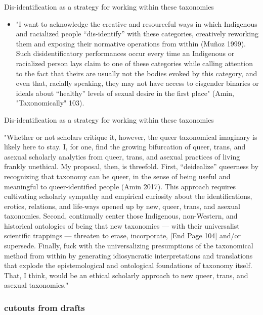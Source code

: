 \documentclass[11pt]{article}
\begin{document}
\begin{enumerate}
Dis-identification as a strategy for working within these taxonomies
\begin{itemize}
\item "I want to acknowledge the creative and resourceful ways in which
Indigenous and racialized people “dis-identify” with these
categories, creatively reworking them and exposing their normative
operations from within (Muñoz 1999). Such disidentificatory
performances occur every time an Indigenous or racialized person
lays claim to one of these categories while calling attention to the
fact that theirs are usually not the bodies evoked by this category,
and even that, racially speaking, they may not have access to
cisgender binaries or ideals about “healthy” levels of sexual desire
in the first place" (Amin, "Taxonomically" 103).
\end{itemize}


Dis-identification as a strategy for working within these taxonomies

"Whether or not scholars critique it, however, the queer taxonomical
imaginary is likely here to stay. I, for one, find the growing
bifurcation of queer, trans, and asexual scholarly analytics from
queer, trans, and asexual practices of living frankly unethical. My
proposal, then, is threefold. First, “deidealize” queerness by
recognizing that taxonomy can be queer, in the sense of being useful
and meaningful to queer-identified people (Amin 2017). This approach
requires cultivating scholarly sympathy and empirical curiosity about
the identifications, erotics, relations, and life-ways opened up by
new, queer, trans, and asexual taxonomies. Second, continually center
those Indigenous, non-Western, and historical ontologies of being that
new taxonomies — with their universalist scientific trappings —
threaten to erase, incorporate, [End Page 104] and/or supersede.
Finally, fuck with the universalizing presumptions of the taxonomical
method from within by generating idiosyncratic interpretations and
translations that explode the epistemological and ontological
foundations of taxonomy itself. That, I think, would be an ethical
scholarly approach to new queer, trans, and asexual taxonomies."
\end{enumerate}

\subsubsection{cutouts from drafts}
\label{sec:orgee6463c}
\end{document}
